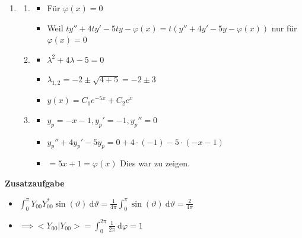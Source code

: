\documentclass[12pt]{article}
\providecommand\d{}
\renewcommand{\d}[1]{\:\mathrm{d}{#1}}
\begin{document}
\begin{enumerate}
\item 
\begin{enumerate}

\item
\begin{itemize}
\item Für $\varphi(x)=0$
\item Weil $ty''+4ty'-5ty-\varphi(x) = t (y''+4y'-5y-\varphi(x))$ nur für $\varphi(x) = 0$
\end{itemize}

\item 
\begin{itemize}
\item $\lambda^2+4\lambda-5=0$
\item $\lambda_{1,2} = -2 \pm \sqrt{4+5} = -2 \pm 3$
\item $y(x) = C_1 e^{-5x} + C_2 e^{x}$
\end{itemize}

\item 
\begin{itemize}
\item $y_p=-x-1, y_p'=-1, y_p'' = 0$
\item $y_p''+4y_p'-5y_p = 0+4\cdot(-1)-5\cdot(-x-1)$
\item $= 5x+1 = \varphi(x)$ Dies war zu zeigen. 
\end{itemize}

\end{enumerate}

\end{enumerate}

\textbf{Zusatzaufgabe}

\begin{itemize}
\item $\int_0^{\pi}Y_{00}Y^{*}_{00}\sin(\vartheta)\d{\vartheta} = \frac{1}{4\pi} \int_0^{\pi}\sin(\vartheta)\d{\vartheta} = \frac{2}{4\pi}$
\item $\implies <Y_{00}|Y_{00}> = \int_0^{2\pi} \frac{1}{2\pi}\d{\varphi} = 1$
\end{itemize}
\end{document}
